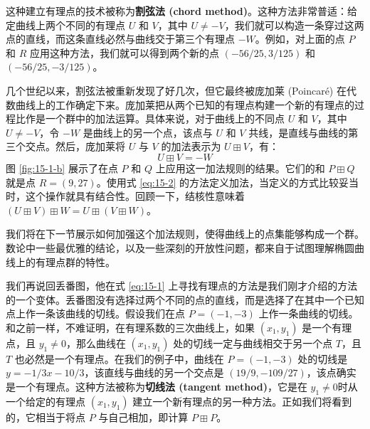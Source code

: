 这种建立有理点的技术被称为\textbf{割弦法 (chord method)}。这种方法非常普适：给定曲线上两个不同的有理点 $U$ 和 $V$，其中 $U\neq-V$，我们就可以构造一条穿过这两点的直线，而这条直线必然与曲线交于第三个有理点 $-W$。例如，对上面的点 $P$ 和 $R$ 应用这种方法，我们就可以得到两个新的点 $(-56/25,3/125)$ 和 $(-56/25,-3/125)$。

几个世纪以来，割弦法被重新发现了好几次，但它最终被庞加莱 (Poincaré) 在代数曲线上的工作确定下来。庞加莱把从两个已知的有理点构建一个新的有理点的过程比作是一个群中的加法运算。具体来说，对于曲线上的不同点 $U$ 和 $V$，其中 $U\neq-V$，令 $-W$ 是曲线上的另一个点，该点与 $U$ 和 $V$ 共线，是直线与曲线的第三个交点。然后，庞加莱将 $U$ 与 $V$ 的加法表示为 $U\boxplus V$，有：
\begin{equation}\label{eq:15-2}
U\boxplus V=-W
\end{equation}
图 \ref{fig:15-1-b} 展示了在点 $P$ 和 $Q$ 上应用这一加法规则的结果。它们的和 $P\boxplus Q$ 就是点 $R=(9,27)$。使用式 \ref{eq:15-2} 的方法定义加法，当定义的方式比较妥当时，这个操作就具有结合性。回顾一下，结核性意味着 $(U\boxplus V)\boxplus W=U\boxplus(V\boxplus W)$。

我们将在下一节展示如何加强这个加法规则，使得曲线上的点集能够构成一个群。数论中一些最优雅的结论，以及一些深刻的开放性问题，都来自于试图理解椭圆曲线上的有理点群的特性。

我们再说回丢番图，他在式 \ref{eq:15-1} 上寻找有理点的方法是我们刚才介绍的方法的一个变体。丢番图没有选择过两个不同的点的直线，而是选择了在其中一个已知点上作一条该曲线的切线。假设我们在点 $P=(-1,-3)$ 上作一条曲线的切线。和之前一样，不难证明，在有理系数的三次曲线上，如果 $(x_1,y_1)$ 是一个有理点，且 $y_1\neq0$，那么曲线在 $(x_1,y_1)$ 处的切线一定与曲线相交于另一个点 $T$，且 $T$ 也必然是一个有理点。在我们的例子中，曲线在 $P=(-1,-3)$ 处的切线是 $y=-{1/3}x-{10/3}$，该直线与曲线的另一个交点是 $({19/9},-{109/27})$，该点确实是一个有理点。这种方法被称为\textbf{切线法 (tangent method)}，它是在 $y_1\neq0$时从一个给定的有理点 $(x_1,y_1)$ 建立一个新有理点的另一种方法。正如我们将看到的，它相当于将点 $P$ 与自己相加，即计算 $P\boxplus P$。